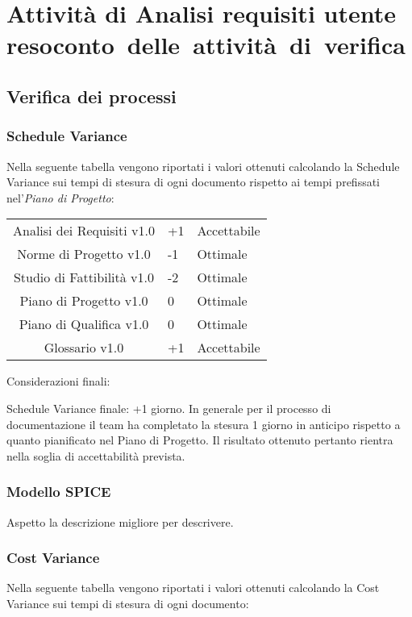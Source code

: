 \newpage
\section{Attività di Analisi requisiti utente \\\large{resoconto~delle~attività~di~verifica}}
\subsection{Verifica dei processi}
\subsubsection{Schedule Variance}
Nella seguente tabella vengono riportati i valori ottenuti calcolando la Schedule Variance sui tempi di stesura di ogni documento rispetto ai tempi prefissati nel'\textit{Piano di Progetto}:

{
	\centering
	\begin{tabular}{| c | R{0.5cm} | C{3cm} |}
	Analisi dei Requisiti v1.0 & +1 & Accettabile \\
	Norme di Progetto v1.0 & -1 & Ottimale \\
	Studio di Fattibilità v1.0 &  -2 &  Ottimale \\
	Piano di Progetto v1.0 &  0 &  Ottimale\\
	Piano di Qualifica v1.0 & 0 & Ottimale \\
	Glossario v1.0 & +1 & Accettabile\\	
	\end{tabular}
}

Considerazioni finali:

Schedule Variance finale: +1 giorno.
In generale per il processo di documentazione il team ha completato la stesura 1 giorno in anticipo rispetto a quanto pianificato nel Piano di Progetto. Il risultato ottenuto pertanto rientra nella soglia di accettabilità prevista.

\subsubsection{Modello SPICE}
Aspetto la descrizione migliore per descrivere.

\subsubsection{Cost Variance}
Nella seguente tabella vengono riportati i valori ottenuti calcolando la Cost Variance sui tempi di stesura di ogni documento:

